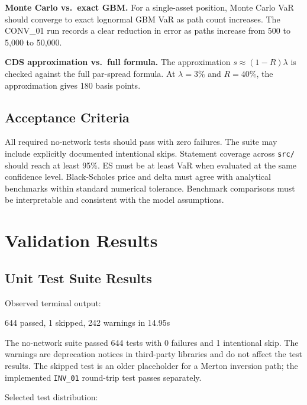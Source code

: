 \documentclass[11pt]{article}
\newcommand{\code}[1]{\texttt{#1}}
\begin{document}
\textbf{Monte Carlo vs.\ exact GBM.}  For a single-asset position, Monte
Carlo VaR should converge to exact lognormal GBM VaR as path count
increases.  The CONV\_01 run records a clear reduction in error as paths
increase from 500 to 5{,}000 to 50{,}000.

\textbf{CDS approximation vs.\ full formula.}  The approximation
$s \approx (1-R)\lambda$ is checked against the full par-spread formula.
At $\lambda=3\%$ and $R=40\%$, the approximation gives 180 basis points.

\subsection{Acceptance Criteria}

All required no-network tests should pass with zero failures.  The suite
may include explicitly documented intentional skips.  Statement coverage
across \code{src/} should reach at least 95\%.  ES must be at least VaR
when evaluated at the same confidence level.  Black-Scholes price and
delta must agree with analytical benchmarks within standard numerical
tolerance.  Benchmark comparisons must be interpretable and consistent
with the model assumptions.

\section{Validation Results}
\label{sec:test-results}

\subsection{Unit Test Suite Results}

Observed terminal output:
\begin{shellcode}
644 passed, 1 skipped, 242 warnings in 14.95s
\end{shellcode}

The no-network suite passed 644 tests with 0 failures and 1 intentional
skip.  The warnings are deprecation notices in third-party libraries and
do not affect the test results.  The skipped test is an older placeholder
for a Merton inversion path; the implemented \code{INV\_01} round-trip
test passes separately.

Selected test distribution:
\end{document}
